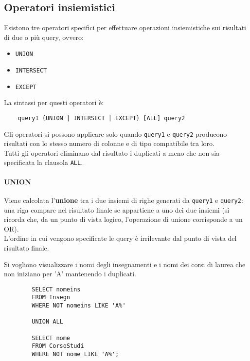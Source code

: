 \documentclass[12pt,a4paper]{book}
\begin{document}
	\subsection{Operatori insiemistici}
	Esistono tre operatori specifici per effettuare operazioni insiemistiche sui risultati di due o più query, ovvero:
	\begin{itemize}
		\item \texttt{UNION}
		\item \texttt{INTERSECT}
		\item \texttt{EXCEPT}
	\end{itemize}
	La sintassi per questi operatori è:
	\begin{lstlisting}
	query1 {UNION | INTERSECT | EXCEPT} [ALL] query2
	\end{lstlisting}
	Gli operatori si possono applicare solo quando \texttt{query1}
	e \texttt{query2} producono risultati con lo stesso numero di colonne e di tipo compatibile tra loro.\\
	Tutti gli operatori eliminano dal risultato i duplicati a meno che non sia specificata la clausola \texttt{ALL}.
	\paragraph{UNION} Viene calcolata l'\textbf{unione} tra i due insiemi di righe generati da \texttt{query1} e \texttt{query2}: una riga compare nel risultato finale se appartiene a uno dei due insiemi (si ricorda che, da un punto di vista logico, l'operazione di unione corrisponde a un OR).\\L'ordine in cui vengono specificate le query è irrilevante dal punto di vista del risultato finale.\\
	\begin{tcolorbox}[enhanced jigsaw, breakable,title=Esempio, title filled]
		Si vogliono visualizzare i nomi degli insegnamenti e i nomi dei corsi di laurea che non iniziano per ’A’ mantenendo i duplicati.
		\begin{lstlisting}
		SELECT nomeins
		FROM Insegn
		WHERE NOT nomeins LIKE 'A%'
		
		UNION ALL
		
		SELECT nome
		FROM CorsoStudi
		WHERE NOT nome LIKE 'A%';
		\end{lstlisting}
	\end{tcolorbox}
\end{document}
